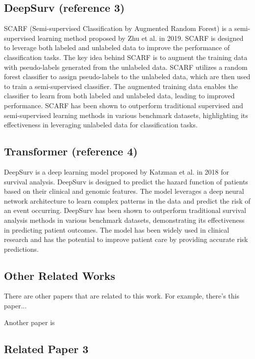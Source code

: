 \documentclass[conference]{ieeeconf}
\begin{document}
\subsection{DeepSurv (reference 3)}

SCARF (Semi-supervised Classification by Augmented Random Forest) is a semi-supervised learning method proposed by
Zhu et al. in 2019. SCARF is designed to leverage both labeled and unlabeled data to improve the performance of classification tasks. The key idea behind SCARF is to augment the training data with pseudo-labels generated from the unlabeled data. SCARF utilizes a random forest classifier to assign pseudo-labels to the unlabeled data, which are then used to train a semi-supervised classifier. The augmented training data enables the classifier to learn from both labeled and unlabeled data, leading to improved performance. SCARF has been shown to outperform traditional supervised and semi-supervised learning methods in various benchmark datasets, highlighting its effectiveness in leveraging unlabeled data for classification tasks.

\subsection{Transformer (reference 4)}

DeepSurv is a deep learning model proposed by Katzman et al. in 2018 for survival analysis. DeepSurv is designed to predict the hazard function of patients based on their clinical and genomic features. The model leverages a deep neural network architecture to learn complex patterns in the data and predict the risk of an event occurring. DeepSurv has been shown to outperform traditional survival analysis methods in various benchmark datasets, demonstrating its effectiveness in predicting patient outcomes. The model has been widely used in clinical research and has the potential to improve patient care by providing accurate risk predictions.

\subsection{Other Related Works}

There are other papers that are related to this work. For example, there's this paper...



Another paper is

\subsection{Related Paper 3}
\end{document}
